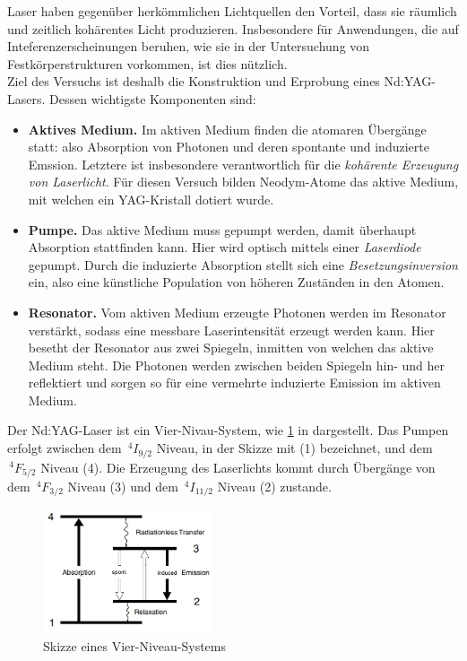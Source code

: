 \documentclass[../main.tex]{subfiles}
\begin{document}
    Laser haben gegenüber herkömmlichen Lichtquellen den Vorteil, dass sie räumlich und zeitlich kohärentes Licht produzieren. Insbesondere für Anwendungen, die auf Inteferenzerscheinungen beruhen, wie sie in der Untersuchung von Festkörperstrukturen vorkommen, ist dies nützlich.\\

    Ziel des Versuchs ist deshalb die Konstruktion und Erprobung eines Nd:YAG-Lasers. Dessen wichtigste Komponenten sind:
    \begin{itemize}
        \item \textbf{Aktives Medium.} Im aktiven Medium finden die atomaren Übergänge statt: also Absorption von Photonen und deren spontante und induzierte Emssion. Letztere ist insbesondere verantwortlich für die \textit{kohärente Erzeugung von Laserlicht}. Für diesen Versuch bilden Neodym-Atome das aktive Medium, mit welchen ein YAG-Kristall dotiert wurde. 
        \item \textbf{Pumpe.} Das aktive Medium muss gepumpt werden, damit überhaupt Absorption stattfinden kann. Hier wird optisch mittels einer \textit{Laserdiode} gepumpt. Durch die induzierte Absorption stellt sich eine \textit{Besetzungsinversion} ein, also eine künstliche Population von höheren Zuständen in den Atomen. 
        \item \textbf{Resonator.} Vom aktiven Medium erzeugte Photonen werden im Resonator verstärkt, sodass eine messbare Laserintensität erzeugt werden kann. Hier besetht der Resonator aus zwei Spiegeln, inmitten von welchen das aktive Medium steht. Die Photonen werden zwischen beiden Spiegeln hin- und her reflektiert und sorgen so für eine vermehrte induzierte Emission im aktiven Medium. 
    \end{itemize}
    
    Der Nd:YAG-Laser ist ein Vier-Nivau-System, wie \ref{fig:Einleitung:VierNivauSystem} in dargestellt. Das Pumpen erfolgt zwischen dem $\,^4 I_{9/2}$ Niveau, in der Skizze mit (1) bezeichnet, und dem $\,^4 F_{5/2}$ Niveau (4). Die Erzeugung des Laserlichts kommt durch Übergänge von dem $\,^4 F_{3/2}$ Niveau (3) und dem $\,^4 I_{11/2}$ Niveau (2) zustande.

    \begin{figure}[H]
        \centering
        \includegraphics[width=5cm]{Bilddateien/Vier-Niveau-System.jpg}
        \caption{Skizze eines Vier-Niveau-Systems \cite[p.6]{doc:experiment08}}
        \label{fig:Einleitung:VierNivauSystem}
    \end{figure}
\end{document}
